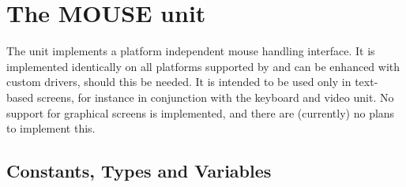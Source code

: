 %
%
%
%
%
%
\chapter{The MOUSE unit}
The  unit implements a platform independent mouse handling 
interface. It is implemented identically on all platforms supported by 
\fpc{} and can be enhanced with custom drivers, should this be needed.
It is intended to be used only in text-based screens, for instance in 
conjunction with the keyboard and video unit. No support for graphical
screens is implemented, and there are (currently) no plans to implement
this.

\section{Constants, Types and Variables}
